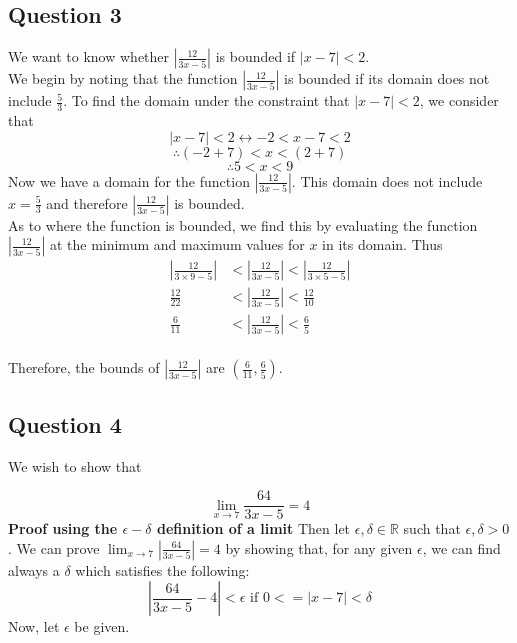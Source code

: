 \documentclass{article}
\begin{document}
\subsection*{Question 3}

We want to know whether $\displaystyle \left| \frac{12}{3x-5} \right|$ is bounded if $\left| x-7 \right|< 2$.\\
We begin by noting that the function $\left| \frac{12}{3x-5} \right|$ is bounded if its domain does not include $\frac{5}{3}$. 
To find the domain under the constraint that $\left| x-7 \right|< 2$, we consider that
$$\left| x-7 \right| < 2 \leftrightarrow -2 < x-7 < 2 $$
$$\therefore \left(-2 + 7 \right) < x < \left(2 + 7\right) $$
$$\therefore 5 < x < 9$$
Now we have a domain for the function $\left| \frac{12}{3x-5} \right|$. This domain
does not include $x = \frac{5}{3}$ and therefore $\left| \frac{12}{3x-5} \right|$ is
bounded. \\
As to where the function is bounded, we find this by evaluating the function $\left| \frac{12}{3x-5} \right|$ at
the minimum and maximum values for $x$ in its domain. Thus
\begin{align*}
\left| \frac{12}{3 \times 9 -5} \right| &< \left| \frac{12}{3x-5} \right| <\left| \frac{12}{3 \times 5 -5} \right|\\
\frac{12}{22} &< \left| \frac{12}{3x-5} \right| < \frac{12}{10} \\
\frac{6}{11}  &< \left| \frac{12}{3x-5} \right| < \frac{6}{5}\\
\end{align*}

Therefore, the bounds of $\displaystyle \left| \frac{12}{3x-5} \right|$ are $\displaystyle \left( \frac{6}{11}, \frac{6}{5}\right)$.

\subsection*{Question 4}

We wish to show that 

$$\lim_{x\to7} \frac{64}{3x-5} = 4$$
\textbf{Proof using the $\epsilon - \delta$ definition of a limit}
Then let $\epsilon,\delta \in \mathbb{R}$ such that $\epsilon,\delta > 0$.
We can prove $\lim_{x\to7} \left| \frac{64}{3x-5} \right| = 4$ by showing that, for any given $\epsilon$, we can find always a $\delta$ which satisfies the following:
$$ \left| \frac{64}{3x-5}  - 4 \right| < \epsilon \text{ if } 0 <= \left| x - 7 \right| < \delta $$
Now, let $\epsilon$ be given.\\
\end{document}
